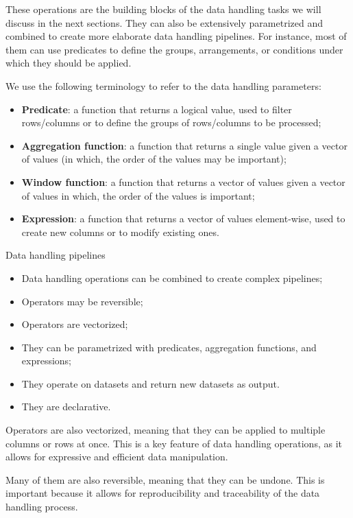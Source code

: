These operations are the building blocks of the data handling tasks we will discuss in the
next sections.  They can also be extensively parametrized and combined to create more
elaborate data handling pipelines.  For instance, most of them can use predicates to
define the groups, arrangements, or conditions under which they should be applied.

We use the following terminology to refer to the data handling parameters:
\begin{itemize}
  \item \textbf{Predicate}: a function that returns a logical value, used to filter
    rows/columns or to define the groups of rows/columns to be processed;
  \item \textbf{Aggregation function}: a function that returns a single value given a vector
    of values (in which, the order of the values may be important);
  \item \textbf{Window function}: a function that returns a vector of values given a vector
    of values in which, the order of the values is important;
  \item \textbf{Expression}: a function that returns a vector of values element-wise, used to create new
    columns or to modify existing ones.
\end{itemize}

\begin{slidebox}{Data handling pipelines}{}
  \begin{itemize}
    \item Data handling operations can be combined to create complex pipelines;
    \item Operators may be reversible;
    \item Operators are vectorized;
    \item They can be parametrized with predicates, aggregation functions, and expressions;
    \item They operate on datasets and return new datasets as output.
    \item They are declarative.
  \end{itemize}
\end{slidebox}

Operators are also vectorized, meaning that they can be applied to multiple columns or
rows at once.  This is a key feature of data handling operations, as it allows for
expressive and efficient data manipulation.

Many of them are also reversible, meaning that they can be undone.  This is important
because it allows for reproducibility and traceability of the data handling process.

